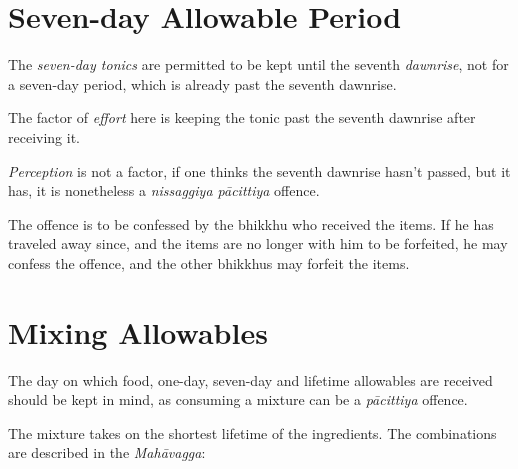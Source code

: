 \section*{Seven-day Allowable Period}

The \emph{seven-day tonics} are permitted to be kept until the seventh
\emph{dawnrise}, not for a seven-day period, which is already past the seventh
dawnrise.

The factor of \emph{effort} here is keeping the tonic past the seventh dawnrise
after receiving it.

\emph{Perception} is not a factor, if one thinks the seventh dawnrise hasn't
passed, but it has, it is nonetheless a \emph{nissaggiya pācittiya} offence.

The offence is to be confessed by the bhikkhu who received the items. If he has
traveled away since, and the items are no longer with him to be forfeited, he
may confess the offence, and the other bhikkhus may forfeit the items.

\section*{Mixing Allowables}

The day on which food, one-day, seven-day and lifetime allowables are received
should be kept in mind, as consuming a mixture can be a \emph{pācittiya}
offence.

The mixture takes on the shortest lifetime of the ingredients. 
The combinations are described in the \emph{Mahāvagga}:

